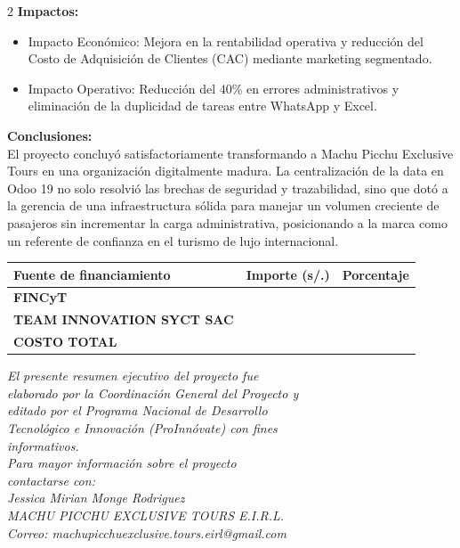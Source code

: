 \documentclass[12pt]{article}
\begin{document}
\begin{multicols}{2}
\textbf{Impactos:}
\begin{itemize}
    \item Impacto Económico: Mejora en la rentabilidad operativa y reducción del Costo de Adquisición de Clientes (CAC) mediante marketing segmentado.
    \item Impacto Operativo: Reducción del 40\% en errores administrativos y eliminación de la duplicidad de tareas entre WhatsApp y Excel.
\end{itemize}

\textbf{Conclusiones:}\\
El proyecto concluyó satisfactoriamente transformando a Machu Picchu Exclusive Tours en una organización digitalmente madura. La centralización de la data en Odoo 19 no solo resolvió las brechas de seguridad y trazabilidad, sino que dotó a la gerencia de una infraestructura sólida para manejar un volumen creciente de pasajeros sin incrementar la carga administrativa, posicionando a la marca como un referente de confianza en el turismo de lujo internacional.
\vspace{0.4cm}
\noindent
\scriptsize
\renewcommand{\arraystretch}{1.15}
\setlength{\tabcolsep}{3pt}
\begin{tabular}{|p{3.25cm}|p{1.35cm}|p{1.45cm}|}
\hline
\textbf{Fuente de financiamiento} & \centering\textbf{Importe (s/.)} & \centering\textbf{Porcentaje}\tabularnewline \hline
\textbf{FINCyT} & & \\ \hline
\textbf{TEAM INNOVATION SYCT SAC} & & \\ \hline
\textbf{COSTO TOTAL} & & \\ \hline
\end{tabular}
\normalsize

\vspace{0.25cm}
\begin{center}
\scriptsize\itshape
El presente resumen ejecutivo del proyecto fue\\
elaborado por la Coordinación General del Proyecto y\\
editado por el Programa Nacional de Desarrollo\\
Tecnológico e Innovación (ProInnóvate) con fines\\
informativos.\\[0.2cm]
Para mayor información sobre el proyecto\\
contactarse con:\\
Jessica Mirian Monge Rodriguez\\
MACHU PICCHU EXCLUSIVE TOURS E.I.R.L.\\
Correo: machupicchuexclusive.tours.eirl@gmail.com
\end{center}
\end{multicols}
\end{document}
